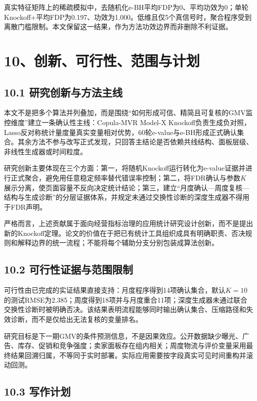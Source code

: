 \documentclass[UTF8,12pt,a4paper]{ctexart}
\begin{document}
真实特征矩阵上的稀疏模拟中，去随机化e-BH平均FDP为0、平均功效为0；单轮Knockoff+平均FDP为0.197、功效为1.000。低维且仅5个真信号时，聚合程序受到离散门槛限制。本文保留这一结果，作为方法功效边界而非删除不利证据。

\newpage
\section*{10、创新、可行性、范围与计划}

\subsection*{10.1 研究创新与方法主线}

本文不是把多个算法并列叠加，而是围绕“如何形成可信、精简且可复核的GMV监控维度”建立一条确认性主线：Copula-MVR Model-X Knockoff负责生成负对照，Lasso反对称统计量度量真实变量相对优势，60轮e-value与e-BH形成正式确认集合。其余方法不参与改写正式发现，只回答主结论是否依赖共线结构、面板层级、非线性生成器或时间粒度。

研究创新主要体现在三个方面：第一，将随机Knockoff运行转化为e-value证据并进行正式聚合，避免用任意稳定频率替代错误率控制；第二，将FDR确认与参数$K$展示分离，使页面容量不反向决定统计结论；第三，建立“月度确认—周度复核—结构与生成诊断”的分层证据体系，并规定未通过交换性诊断的深度生成器不得用于FDR声明。

严格而言，上述贡献属于面向经营指标治理的应用统计研究设计创新，而不是提出新的Knockoff定理。论文的价值在于把已有统计工具组织成具有明确职责、否决规则和解释边界的统一流程；不能将每个辅助分支分别包装成算法创新。

\subsection*{10.2 可行性证据与范围限制}

可行性由已完成的实证结果直接支持：月度程序得到14项确认集合，默认$K=10$的测试RMSE为2.385；周度得到18项并与月度重合11项；深度生成器未通过联合交换性诊断时被明确否决。该结果表明流程能够同时输出确认集合、压缩路径和失效诊断，而不是仅给出无法复核的变量排名。

研究目标是下一期GMV的条件预测信息，不是因果效应。公开数据缺少曝光、广告、库存、促销和竞争强度；卖家面板存在组内相关；周度物流与评价变量采用最终结果回溯归属，不等同于实时部署。实际应用需要按字段真实可见时间重构并滚动回测。

\subsection*{10.3 写作计划}
\end{document}
